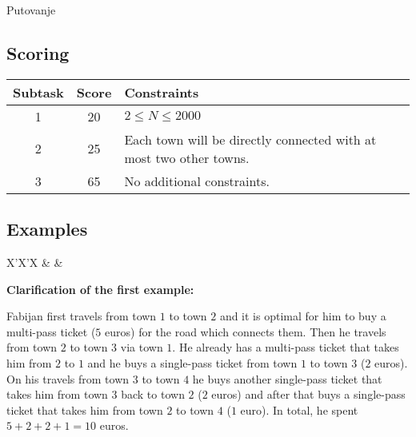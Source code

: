 \begin{statement}[
  problempoints=110,
  timelimit=1 second,
  memorylimit=512 MiB,
]{Putovanje}
 \subsection*{Scoring}
{\renewcommand{\arraystretch}{1.4}
  \setlength{\tabcolsep}{6pt}
  \begin{tabular}{ccl}
 Subtask & Score & Constraints \\ \midrule
  1 & 20 & $2 \le N \le 2000$ \\
  2 & 25 & Each town will be directly connected with at most two other towns. \\
  3 & 65 & No additional constraints.
\end{tabular}}

\subsection*{Examples}
\begin{tabularx}{\textwidth}{X'X'X}
 &
 &
\end{tabularx}

\clearpage

\textbf{Clarification of the first example:}

Fabijan first travels from town $1$ to town $2$ and it is optimal for
him to buy a multi-pass ticket ($5$ euros) for the road which connects them.
Then he travels from town $2$ to town $3$ via town $1$. He already has a
multi-pass ticket that takes him from $2$ to $1$ and he buys a single-pass
ticket from town $1$ to town $3$ ($2$ euros). On his travels from town $3$ to
town $4$ he buys another single-pass ticket that takes him from town $3$ back
to town $2$ ($2$ euros) and after that buys a single-pass ticket that takes him from town $2$
to town $4$ ($1$ euro). In total, he spent $5+2+2+1=10$ euros.

\end{statement}

